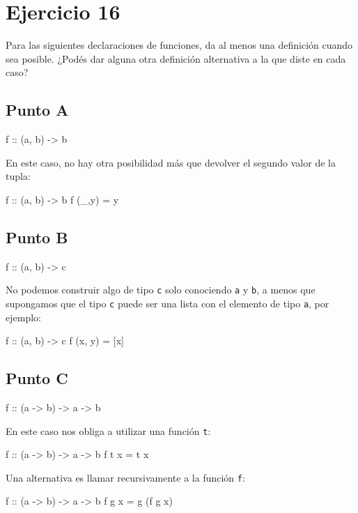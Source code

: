 \documentclass{article}
\begin{document}
\section*{Ejercicio 16}
Para las siguientes declaraciones de funciones, da al menos una deﬁnición cuando sea posible. ¿Podés dar alguna otra deﬁnición alternativa a la que diste en cada caso?

\subsection*{Punto A}
\begin{haskell}
f :: (a, b) -> b
\end{haskell}

En este caso, no hay otra posibilidad más que devolver el segundo valor de la tupla:
\begin{haskell}
f :: (a, b) -> b
f (_,y) = y
\end{haskell}

\subsection*{Punto B}
\begin{haskell}
f :: (a, b) -> c
\end{haskell}
    
No podemos construir algo de tipo \verb|c| solo conociendo \verb|a| y \verb|b|, a menos que supongamos que el tipo \verb|c| puede ser una lista con el elemento de tipo \verb|a|, por ejemplo:
\begin{haskell}
f :: (a, b) -> c 
f (x, y) = [x]
\end{haskell}
    
\subsection*{Punto C}
\begin{haskell}
f :: (a -> b) -> a -> b
\end{haskell}
    
    En este caso nos obliga a utilizar una función \verb|t|:
\begin{haskell}
f :: (a -> b) -> a -> b
f t x = t x
\end{haskell}
    
    Una alternativa es llamar recursivamente a la función \verb|f|:
\begin{haskell}
f :: (a -> b) -> a -> b
f g x = g (f g x)
\end{haskell}
    
\end{document}

